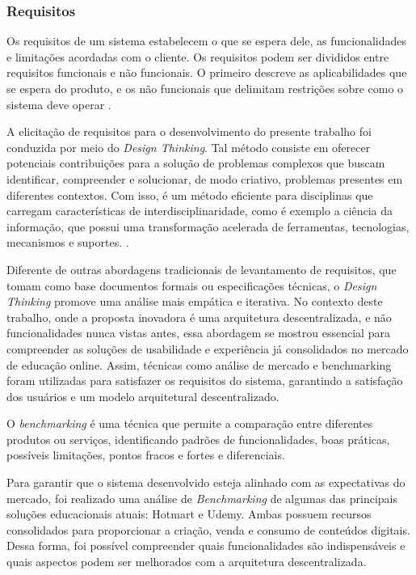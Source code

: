         \subsubsection{Requisitos}
        Os requisitos de um sistema estabelecem o que se espera dele, as funcionalidades e limitações acordadas com o cliente. Os requisitos podem ser divididos entre requisitos funcionais e não funcionais. O primeiro descreve as aplicabilidades que se espera do produto, e os não funcionais que delimitam restrições sobre como o sistema deve operar \cite{sommerville2011}.

        A elicitação de requisitos para o desenvolvimento do presente trabalho foi conduzida por meio do \textit{Design Thinking}. Tal método consiste em oferecer potenciais contribuições para a solução de problemas complexos que buscam identificar, compreender e solucionar, de modo criativo, problemas presentes em diferentes contextos. Com isso, é um método eficiente para disciplinas que carregam características de interdisciplinaridade, como é exemplo a ciência da informação, que possui uma transformação acelerada de ferramentas, tecnologias, mecanismos e suportes. \cite{apocalypse2022}.

        Diferente de outras abordagens tradicionais de levantamento de requisitos, que tomam como base documentos formais ou especificações técnicas, o \textit{Design Thinking} promove uma análise mais empática e iterativa. No contexto deste trabalho, onde a proposta inovadora é uma arquitetura descentralizada, e não funcionalidades nunca vistas antes, essa abordagem se mostrou essencial para compreender as soluções de usabilidade e experiência já consolidados no mercado de educação online. Assim, técnicas como análise de mercado e benchmarking foram utilizadas para satisfazer os requisitos do sistema, garantindo a satisfação dos usuários e um modelo arquitetural descentralizado.

        O \textit{benchmarking} é uma técnica que permite a comparação entre diferentes produtos ou serviços, identificando padrões de funcionalidades, boas práticas, possíveis limitações, pontos fracos e fortes e diferenciais.

        Para garantir que o sistema desenvolvido esteja alinhado com as expectativas do mercado, foi realizado uma análise de \textit{Benchmarking} de algumas das principais soluções educacionais atuais: Hotmart e Udemy. Ambas possuem recursos consolidados para proporcionar a criação, venda e consumo de conteúdos digitais. Dessa forma, foi possível compreender quais funcionalidades são indispensáveis e quais aspectos podem ser melhorados com a arquitetura descentralizada.

